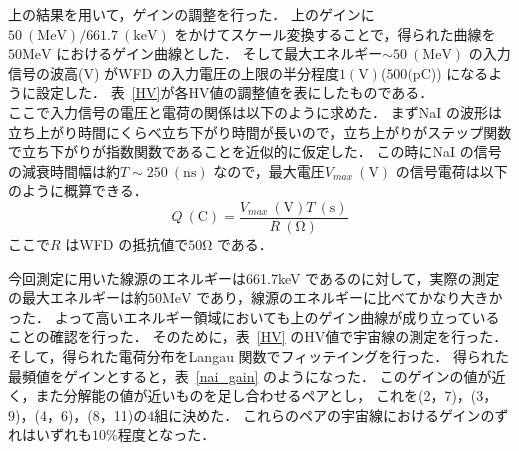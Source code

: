 上の結果を用いて，ゲインの調整を行った．
上のゲインに$50~(\mathrm{MeV})/661.7~(\mathrm{keV})$ をかけてスケール変換することで，得られた曲線を$50\mathrm{MeV}$ におけるゲイン曲線とした．
そして最大エネルギー$\sim 50~(\mathrm{MeV})$ の入力信号の波高($\mathrm{V}$) がWFD の入力電圧の上限の半分程度$1(\mathrm{V})$($500(\mathrm{pC}$)) になるように設定した．
表~\ref{HV}が各HV値の調整値を表にしたものである．\\
ここで入力信号の電圧と電荷の関係は以下のように求めた．
まずNaI の波形は立ち上がり時間にくらべ立ち下がり時間が長いので，立ち上がりがステップ関数で立ち下がりが指数関数であることを近似的に仮定した．
この時にNaI の信号の減衰時間幅は約$T\sim 250~(\mathrm{ns})$ なので，最大電圧$V_{max}~(\mathrm{V})$ の信号電荷は以下のように概算できる．
\begin{equation}
Q~(\mathrm{C}) = \frac{V_{max}~(\mathrm{V})T~(\mathrm{s})}{R~(\mathrm{\Omega})}
\end{equation}
ここで$R$ はWFD の抵抗値で$50\mathrm{\Omega}$ である．

今回測定に用いた線源のエネルギーは661.7keV であるのに対して，実際の測定の最大エネルギーは約$50\mathrm{MeV}$ であり，線源のエネルギーに比べてかなり大きかった．
よって高いエネルギー領域においても上のゲイン曲線が成り立っていることの確認を行った．
そのために，表~\ref{HV} のHV値で宇宙線の測定を行った．
そして，得られた電荷分布をLangau 関数でフィッテイングを行った．
得られた最頻値をゲインとすると，表~\ref{nai_gain} のようになった．
このゲインの値が近く，また分解能の値が近いものを足し合わせるペアとし，
これを(2，7)，(3，9)，(4，6)，(8，11)の4組に決めた．
これらのペアの宇宙線におけるゲインのずれはいずれも$10\%$程度となった．

